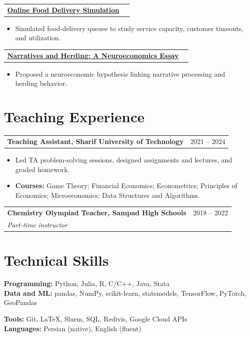 \documentclass[letterpaper,11pt]{article}
\makeatletter
\newcommand{\entry}[4]{
  \par\addvspace{4pt}
  \begin{tabularx}{\textwidth}{@{}Xr@{}}
    \normalsize\textbf{#1} & \normalsize #2 \\[1pt]
    \textit{\small #3} & \textit{\small #4}
  \end{tabularx}\par\vspace{-3pt}
}
\newlength{\projectgap}
\newcommand{\projectentry}[3][\projectgap]{
  \par\addvspace{#1}
  \begin{tabularx}{\textwidth}{@{}Xr@{}}
    \normalsize\textbf{#2} & \normalsize #3
  \end{tabularx}\vspace{-1pt}
}
\newenvironment{cvitems}[1][3pt]
  {\small\begin{itemize}[leftmargin=0.55cm, itemsep=3pt, parsep=0pt, topsep=#1]}
  {\end{itemize}\vspace{-5pt}}
\newcommand{\link}[2]{\href{#1}{\textcolor{cvblue}{#2}}}
\makeatother
\begin{document}
\projectentry{\link{https://github.com/AmBadAl/online-food-delivery-simulation}{Online Food Delivery Simulation}}{}
\begin{cvitems}
  \item Simulated food-delivery queues to study service capacity, customer timeouts, and utilization.
\end{cvitems}

\projectentry{\link{https://github.com/AmBadAl/Neuroeconomics-Essay}{Narratives and Herding: A Neuroeconomics Essay}}{}
\begin{cvitems}
  \item Proposed a neuroeconomic hypothesis linking narrative processing and herding behavior.
\end{cvitems}

\par\endgroup
\section{Teaching Experience}

\projectentry[0pt]{Teaching Assistant, Sharif University of Technology}{2021 -- 2024}
\begin{cvitems}
  \item Led TA problem-solving sessions, designed assignments and lectures, and graded homework.
  \item \textbf{Courses:} Game Theory; Financial Economics; Econometrics; Principles of Economics; Microeconomics; Data Structures and Algorithms.
\end{cvitems}

\par\vspace{5pt}
\entry
  {Chemistry Olympiad Teacher, Sampad High Schools}{2018 -- 2022}
  {Part-time instructor}
  {}


\section{Technical Skills}

\begin{multicols}{2}
\small
\textbf{Programming:} Python, Julia, R, C/C++, Java, Stata\\
\textbf{Data and ML:} pandas, NumPy, scikit-learn, statsmodels, TensorFlow, PyTorch, GeoPandas

\columnbreak
\textbf{Tools:} Git, \LaTeX, Slurm, SQL, Redivis, Google Cloud APIs\\
\textbf{Languages:} Persian (native), English (fluent)
\end{multicols}
\end{document}
